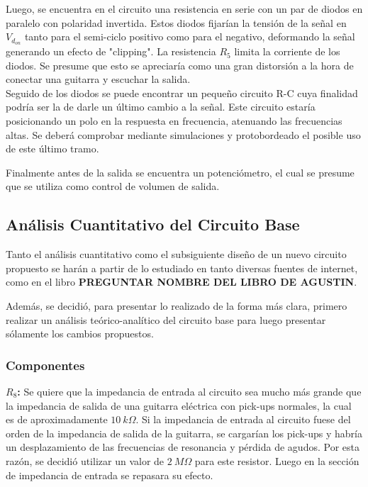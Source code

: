 Luego, se encuentra en el circuito una resistencia en serie con un par de diodos en paralelo con polaridad invertida. Estos diodos fijarían la tensión de la señal en $V_{d_{on}}$ tanto para el semi-ciclo positivo como para el negativo, deformando la señal generando un efecto de "clipping". La resistencia $R_5$ limita la corriente de los diodos. Se presume que esto se apreciaría como una gran distorsión a la hora de conectar una guitarra y escuchar la salida.\\

Seguido de los diodos se puede encontrar un pequeño circuito R-C cuya finalidad podría ser la de darle un último cambio a la señal. Este circuito estaría posicionando un polo en la respuesta en frecuencia, atenuando las frecuencias altas. Se deberá comprobar mediante simulaciones y protobordeado el posible uso de este último tramo.

Finalmente antes de la salida se encuentra un potenciómetro, el cual se presume que se utiliza como control de volumen de salida.

\subsection{Análisis Cuantitativo del Circuito Base}

Tanto el análisis cuantitativo como el subsiguiente diseño de un nuevo circuito propuesto se harán a partir de lo estudiado en tanto diversas fuentes de internet, como en el libro \textbf{PREGUNTAR NOMBRE DEL LIBRO DE AGUSTIN}.

Además, se decidió, para presentar lo realizado de la forma más clara, primero realizar un análisis teórico-analítico del circuito base para luego presentar sólamente los cambios propuestos.

\subsubsection{Componentes}

\textbf{$R_8$:} Se quiere que la impedancia de entrada al circuito sea mucho más grande que la impedancia de salida de una guitarra eléctrica con pick-ups normales, la cual es de aproximadamente $10 \ k\Omega$. Si la impedancia de entrada al circuito fuese del orden de la impedancia de salida de la guitarra, se cargarían los pick-ups y habría un desplazamiento de las frecuencias de resonancia y pérdida de agudos. Por esta razón, se decidió utilizar un valor de $2 \ M\Omega$ para este resistor. Luego en la sección de impedancia de entrada se repasara su efecto. \\

